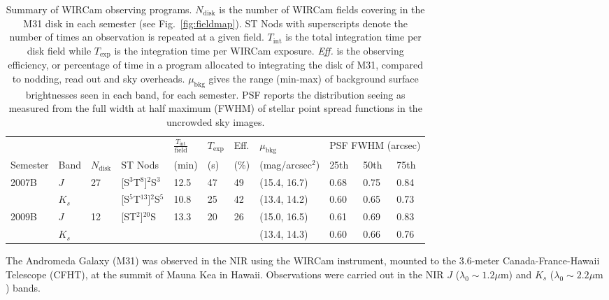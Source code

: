 \documentclass[iop]{emulateapj}
\newcommand{\Fig}[1]{Fig.~\ref{fig:#1}}  %
\begin{document}
\begin{table}[t]
\caption[Summary of WIRCam observing programs]{Summary of WIRCam observing programs.
$N_\mathrm{disk}$ is the number of WIRCam fields covering in the M31 disk in each semester (see \Fig{fieldmap}).
ST Nods with superscripts denote the number of times an observation is repeated at a given field.
$T_\mathrm{int}$ is the total integration time per disk field while $T_\mathrm{exp}$ is the integration time per WIRCam exposure.
\emph{Eff.} is the observing efficiency, or percentage of time in a program allocated to integrating the disk of M31, compared to nodding, read out and sky overheads.
$\mu_\mathrm{bkg}$ gives the range (min-max) of background surface brightnesses seen in each band, for each semester.
PSF reports the distribution seeing as measured from the full width at half maximum (FWHM) of stellar point spread functions in the uncrowded sky images.}
\label{tab:obssummary}
    
    \centering
    \begin{tabular}{lllllllllll}
        & & & & $\frac{T_\mathrm{int}}{\mathrm{field}}$ & $T_\mathrm{exp}$ & Eff. & $\mu_\mathrm{bkg}$ & \multicolumn{3}{c}{PSF FWHM (arcsec)} \\ \cline{9-11}
    Semester & Band & $N_\mathrm{disk}$ & ST Nods & (min) &  (s) &  (\%) & (mag/arcsec$^2$) & 25th  & 50th & 75th \\
    \hline
    \multirow{2}{*}{2007B} & $J$ & \multirow{2}{*}{27} & [S$^3$T$^8$]$^{2}$S$^3$ & 12.5 & 47 & 49 & (15.4, 16.7) & 0.68 & 0.75 & 0.84 \\
     & $K_s$ &  & [S$^5$T$^{13}$]${^2}$S$^5$ & 10.8 & 25 & 42 & (13.4, 14.2) & 0.60 &  0.65 & 0.73 \\
     \hline
     \multirow{2}{*}{2009B} & $J$ & \multirow{2}{*}{12} & \multirow{2}{*}{[ST$^2$]$^{20}$S} & \multirow{2}{*}{13.3} & \multirow{2}{*}{20} & \multirow{2}{*}{26} & (15.0, 16.5) & 0.61 & 0.69 & 0.83 \\
                            & $K_s$ & & & & & & (13.4, 14.3) & 0.60 & 0.66 & 0.76 \\
    \end{tabular}
\end{table}

The Andromeda Galaxy (M31) was observed in the NIR using the WIRCam instrument, mounted to the 3.6-meter Canada-France-Hawaii Telescope (CFHT), at the summit of Mauna Kea in Hawaii.
Observations were carried out in the NIR $J$ ($\lambda_0 \sim 1.2 \mu\mathrm{m}$) and $K_s$ ($\lambda_0 \sim 2.2 \mu\mathrm{m}$) bands.
\end{document}
